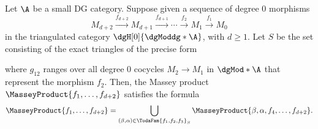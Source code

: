 \documentclass[a4paper]{amsart}
\begin{document}
\begin{proposition}
  \label{prop:MasseyProduct_alt}
  Let $\A$ be a small DG category. Suppose given a sequence of degree $0$
  morphisms
  \[
    M_{d+2}\xrightarrow{f_{d+2}}M_{d+1}\xrightarrow{f_{d+1}}\cdots\xrightarrow{f_2}M_1\xrightarrow{f_1}M_0
  \]
  in the triangulated category $\dgH[0]{\dgModdg*{\A}}$, with $d\geq1$. Let $S$
  be the set consisting of the exact triangles of the precise form
  \begin{center}
  \end{center}
  where $g_{12}$ ranges over all degree $0$ cocycles $M_2\to M_1$ in
  $\dgMod*{\A}$ that represent the morphism $f_2$. Then, the Massey product
  $\MasseyProduct{f_1,\dots,f_{d+2}}$ satisfies the formula
  \[
    \MasseyProduct{f_1,\dots,f_{d+2}}=\bigcup_{(\beta,\alpha)\in\TodaFam{f_1,f_2,f_3}_S}\MasseyProduct{\beta,\alpha,f_4,\dots,f_{d+2}}.
  \]
\end{proposition}
\end{document}
